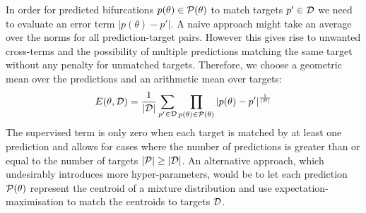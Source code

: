 \documentclass{article}
\begin{document}
In order for predicted bifurcations $p(\theta)\in\mathcal{P}(\theta)$ to match targets $p'\in\mathcal{D}$ we need to evaluate an error term $|p(\theta)-p'|$. A naive approach might take an average over the norms for all prediction-target pairs. However this gives rise to unwanted cross-terms and the possibility of multiple predictions matching the same target without any penalty for unmatched targets. Therefore, we choose a geometric mean over the predictions and an arithmetic mean over targets:
\begin{equation}
    E(\theta, \mathcal{D}) = \frac{1}{|\mathcal{D}|}\sum_{p'\in\mathcal{D}}
    \prod_{p(\theta)\in\mathcal{P}(\theta)}|p(\theta)-p'|
    ^{\frac{1}{|\mathcal{P}|}}
    \label{eq:error}
\end{equation}
The supervised term is only zero when each target is matched by at least one prediction and allows for cases where the number of predictions is greater than or equal to the number of targets $|\mathcal{P}| \geq |\mathcal{D}|$. An alternative approach, which undesirably introduces more hyper-parameters, would be to let each prediction $\mathcal{P}(\theta)$ represent the centroid of a mixture distribution and use expectation-maximisation to match the centroids to targets $\mathcal{D}$.
\end{document}
